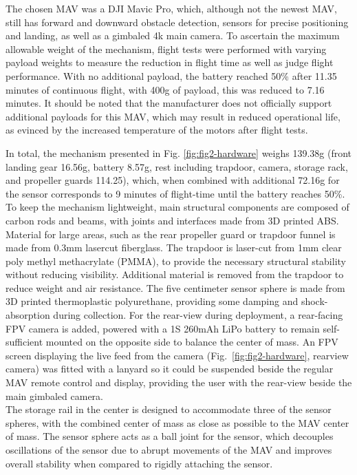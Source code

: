 The chosen \gls{MAV} was a DJI Mavic Pro, which, although not the newest \gls{MAV}, still has forward and downward obstacle detection, sensors for precise positioning and landing, as well as a gimbaled 4k main camera. To ascertain the maximum allowable weight of the mechanism, flight tests were performed with varying payload weights to measure the reduction in flight time as well as judge flight performance. With no additional payload, the battery reached 50\% after 11.35 minutes of continuous flight, with 400g of payload, this was reduced to 7.16 minutes. It should be noted that the manufacturer does not officially support additional payloads for this \gls{MAV}, which may result in reduced operational life, as evinced by the increased temperature of the motors after flight tests.

In total, the mechanism presented in Fig. \ref{fig:fig2-hardware} weighs 139.38g (front landing gear 16.56g, battery 8.57g, rest including trapdoor, camera, storage rack, and propeller guards 114.25), which, when combined with additional 72.16g for the sensor corresponds to 9 minutes of flight-time until the battery reaches 50\%. 
To keep the mechanism lightweight, main structural components are composed of carbon rods and beams, with joints and interfaces made from 3D printed ABS. Material for large areas, such as the rear propeller guard or trapdoor funnel is made from 0.3mm lasercut fiberglass. The trapdoor is laser-cut from 1mm clear poly methyl methacrylate (PMMA), to provide the necessary structural stability without reducing visibility. Additional material is removed from the trapdoor to reduce weight and air resistance. The five centimeter sensor sphere is made from 3D printed thermoplastic polyurethane, providing some damping and shock-absorption during collection. 
For the rear-view during deployment, a rear-facing \gls{FPV} camera is added, powered with a 1S 260mAh LiPo battery to remain self-sufficient mounted on the opposite side to balance the center of mass. An \gls{FPV} screen displaying the live feed from the camera (Fig.~\ref{fig:fig2-hardware}, rearview camera) was fitted with a lanyard so it could be suspended beside the regular \gls{MAV} remote control and display, providing the user with the rear-view beside the main gimbaled camera.
\\
\indent The storage rail in the center is designed to accommodate three of the sensor spheres, with the combined center of mass as close as possible to the \gls{MAV} center of mass. The sensor sphere acts as a ball joint for the sensor, which decouples oscillations of the sensor due to abrupt movements of the \gls{MAV} and improves overall stability when compared to rigidly attaching the sensor.  

